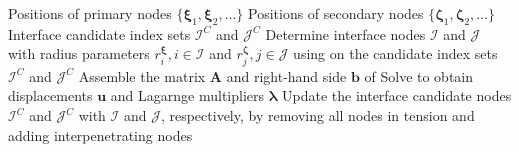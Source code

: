 \begin{algorithmic}[1]
    \Require Positions of primary nodes $\{\boldsymbol{\xi}_1, \boldsymbol{\xi}_2, \dots\}$
    \Require Positions of secondary nodes $\{\boldsymbol{\zeta}_1, \boldsymbol{\zeta}_2, \dots\}$
    \Require Interface candidate index sets $\mathcal{I}^C$ and $\mathcal{J}^C$
        \State Determine interface nodes $\mathcal{I}$ and $\mathcal{J}$ with radius parameters $r^{\boldsymbol{\xi}}_i, i \in \mathcal{I}$
        and $r^{\boldsymbol{\zeta}}_j, j \in \mathcal{J}$  using  on the candidate index sets $\mathcal{I}^C$ and $\mathcal{J}^C$
        \State Assemble the matrix $\mathbf{A}$ and right-hand side $\mathbf{b}$ of 
        \State Solve  to obtain displacements $\mathbf{u}$ and Lagarnge multipliers $\boldsymbol{\lambda}$
        \State Update the interface candidate nodes $\mathcal{I}^C$ and $\mathcal{J}^C$ with
        $\mathcal{I}$ and $\mathcal{J}$, respectively, by removing all nodes in tension
        and adding interpenetrating nodes
    \EndWhile
\end{algorithmic}